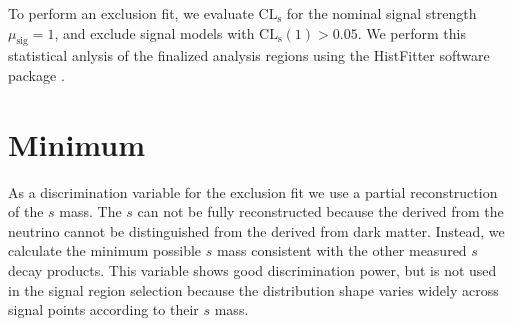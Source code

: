 To perform an exclusion fit, we evaluate $\text{CL}_\text{s}$ for the nominal signal strength $\mu_{\text{sig}} = 1$, and exclude signal models with $\text{CL}_\text{s}(1) > 0.05$. We perform this statistical anlysis of the finalized analysis regions using the HistFitter software package \cite{HistFitter}.

\section{Minimum \ms}
As a discrimination variable for the exclusion fit we use a partial reconstruction of the $s$ mass. The $s$ can not be fully reconstructed because the \met derived from the neutrino cannot be distinguished from the \met derived from dark matter. Instead, we calculate the minimum possible $s$ mass \minms consistent with the other measured $s$ decay products. This variable shows good discrimination power, but is not used in the signal region selection because the distribution shape varies widely across signal points according to their $s$ mass.

